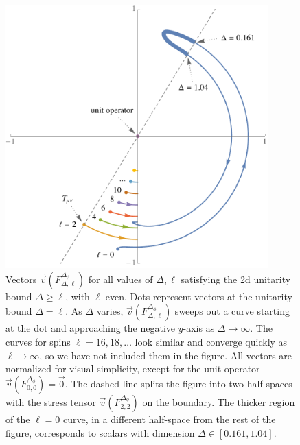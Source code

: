 \documentclass[11pt]{ws-rv9x6}
\newcommand\f\phi
\newcommand\<\langle
\renewcommand\>\rangle
\renewcommand\.{\cdot}
\newcommand\De{\Delta}
\newcommand\oo\infty
\begin{document}
\begin{figure}
\begin{center}
\includegraphics[width=0.9\textwidth]{2dVectorsExample}
\end{center}
\caption{Vectors $\vec v(F_{\De,\ell}^{\De_\f})$ for all values of $\De,\ell$ satisfying the 2d unitarity bound $\De\geq \ell$, with $\ell$ even.  Dots represent vectors at the unitarity bound $\De=\ell$.  As $\De$ varies, $\vec v(F_{\De,\ell}^{\De_\f})$ sweeps out a curve starting at the dot and approaching  the negative $y$-axis as $\De\to \oo$. The curves for spins $\ell=16,18,\dots$ look similar and converge quickly as $\ell\to \oo$, so we have not included them in the figure.  All vectors are normalized for visual simplicity, except for the unit operator $\vec v(F_{0,0}^{\De_\f})=\vec 0$.  The dashed line splits the figure into two half-spaces with the stress tensor $\vec v(F_{2,2}^{\De_\f})$ on the boundary.  The thicker region of the $\ell=0$ curve, in a different half-space from the rest of the figure, corresponds to scalars with dimension $\De\in[0.161,1.04]$.}
\label{fig:twodvectorsexample} 
\end{figure}
\end{document}
